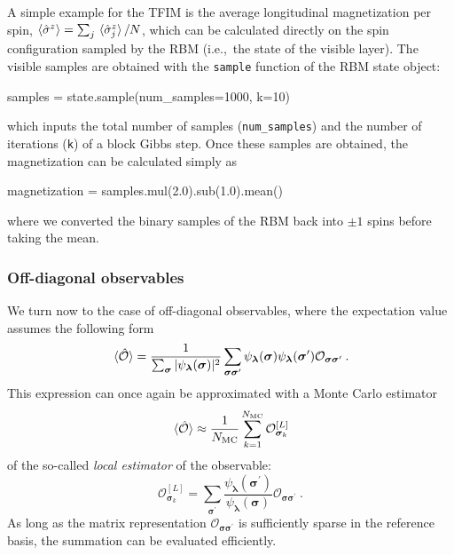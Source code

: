 \documentclass[submission, Phys, hidelnks]{SciPost}
\begin{document}
A simple example for the TFIM is the average longitudinal magnetization per
spin, $\ev{\hat\sigma^z} = \sum_j\ev*{\hat{\sigma}^z_j}/N$,
which can be calculated directly on the spin configuration sampled by the RBM
(i.e.,~the state of the visible layer). The visible samples are obtained with
the \verb|sample| function of the RBM state object:
\begin{python}
samples = state.sample(num_samples=1000, k=10)
\end{python}
which inputs the total number of samples (\verb|num_samples|) and the number
of iterations (\verb|k|) of a block Gibbs step. Once these samples are obtained,
the magnetization can be calculated simply as
\begin{python}
magnetization = samples.mul(2.0).sub(1.0).mean()
\end{python}
where we converted the binary samples of the RBM back into $\pm 1$ spins before
taking the mean.


\subsubsection{Off-diagonal observables}

We turn now to the case of off-diagonal observables, where the expectation
value assumes the following form
\begin{equation}
    \ev*{\hat{\mathcal{O}}} = \frac{1}{\sum_{\bm{\sigma}} |\psi_{\bm{\lambda}}(\bm{\sigma})|^2}
    \sum_{\bm{\sigma\sigma}^\prime} \psi_{\bm{\lambda}}(\bm{\sigma})
    \psi_{\bm{\lambda}}(\bm{\sigma}^\prime)\mathcal{O}_{\bm{\sigma\sigma}^\prime}\:.
\end{equation}
This expression can once again be approximated with a Monte Carlo estimator
\begin{equation}
    \ev*{\hat{\mathcal{O}}} \approx \frac{1}{N_{\rm MC}} \sum_{k=1}^{N_{\rm MC}} \mathcal{O}^{[L]}_{\bm{\sigma}_k}
\end{equation}
of the so-called \emph{local estimator} of the observable:
\begin{equation}
    \mathcal{O}^{[L]}_{\bm{\sigma}_k}=\sum_{\bm{\sigma}^\prime}\frac{\psi_{\bm{\lambda}}(\bm{\sigma}^\prime)}{\psi_{\bm{\lambda}}(\bm{\sigma})} \mathcal{O}_{\bm{\sigma\sigma}^\prime}\:.
\end{equation}
As long as the matrix representation $\mathcal{O}_{\bm{\sigma\sigma}^\prime}$
is sufficiently sparse in the reference basis, the summation can be evaluated
efficiently.
\end{document}
